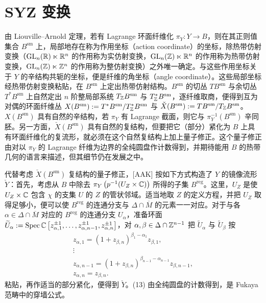\section{SYZ 变换}

由 Liouville--Arnold 定理，若有 Lagrange 环面纤维化 $\pi_Y:Y\to B$，则在其正则值集合 $B^{\mathrm{sm}}$ 上，局部地存在称为作用坐标（action coordinate）的坐标，除热带仿射变换（$\mathrm{GL}_n(\mathbb{R})\ltimes\mathbb{R}^n$ 的作用称为实仿射变换，$\mathrm{GL}_n(\mathbb{Z})\ltimes\mathbb{R}^n$ 的作用称为热带仿射变换，$\mathrm{GL}_n(\mathbb{Z})\ltimes\mathbb{Z}^n$ 的作用称为整仿射变换）之外唯一确定。与这些作用坐标关于 $Y$ 的辛结构共轭的坐标，便是纤维的角坐标（angle coordinate）。这些局部坐标经热带仿射变换粘贴，在 $B^{\mathrm{sm}}$ 上定出热带仿射结构。$B^{\mathrm{sm}}$ 的切丛 $TB^{\mathrm{sm}}$ 与余切丛 $T^*B^{\mathrm{sm}}$ 上自然定出 $n$ 阶整局部系统 $T_{\mathbb{Z}}B^{\mathrm{sm}}$ 与 $T^*_{\mathbb{Z}}B^{\mathrm{sm}}$，逐纤维取商，便得到互为对偶的环面纤维丛 $X(B^{\mathrm{sm}}):=T^*B^{\mathrm{sm}}/T^*_{\mathbb{Z}}B^{\mathrm{sm}}$ 与 $\check X(B^{\mathrm{sm}}):=TB^{\mathrm{sm}}/T_{\mathbb{Z}}B^{\mathrm{sm}}$。$X(B^{\mathrm{sm}})$ 具有自然的辛结构，若 $\pi_Y$ 有 Lagrange 截面，则它与 $\pi_Y^{-1}(B^{\mathrm{sm}})$ 辛同胚。另一方面，$\check X(B^{\mathrm{sm}})$ 具有自然的复结构，但要把它（部分）紧化为 $B$ 上具有环面纤维化的复流形，就必须在这个自然复结构上加上量子修正。这个量子修正由对以 $\pi_Y$ 的 Lagrange 纤维为边界的全纯圆盘作计数得到，并期待能用 $B$ 的热带几何的语言来描述，但其细节仍在发展之中。

代替考虑 $\check X(B^{\mathrm{sm}})$ 复结构的量子修正，[AAK] 按如下方式构造了 $Y$ 的镜像流形 $\check Y$：首先，考虑从 $B$ 中除去 $\pi_Y\left(p^{-1}(U_Z\times\mathbb{C})\right)$ 所得的子集 $B^{\mathrm{reg}}$。这里，$U_Z$ 是使 $U_Z\times\mathbb{C}$ 包含 $\chi$ 的支集 $U$ 的 $Z$ 的管状邻域。适当地取 $Z$ 的定义方程，并把 $U_Z$ 取得足够小，便可以使 $B^{\mathrm{reg}}$ 的连通分支与 $\Delta\cap\overline{M}$ 的元素一一对应。对于与各 $\alpha\in\Delta\cap\overline{M}$ 对应的 $B^{\mathrm{reg}}$ 的连通分支 $U_\alpha$，准备环面 $\widetilde U_\alpha:=\operatorname{Spec}\mathbb{C}\left[z_{\alpha,1}^{\pm1},\dots,z_{\alpha,n-1}^{\pm1},z_{\alpha,n}^{\pm1}\right]$，对 $\alpha,\beta\in\Delta\cap\mathbb{Z}^{n-1}$ 把 $\widetilde U_\alpha$ 与 $\widetilde U_\beta$ 按
\begin{equation}
\begin{gathered}
z_{\alpha,1}=(1+z_{\beta,n})^{\beta_1-\alpha_1}z_{\beta,1},\\
\vdots\\
z_{\alpha,n-1}=(1+z_{\beta,n})^{\beta_{n-1}-\alpha_{n-1}}z_{\beta,n-1},\\
z_{\alpha,n}=z_{\beta,n}.
\end{gathered}
\tag{13}
\end{equation}
\noindent 粘贴，再作适当的部分紧化，便得到 $\check Y$。(13) 由全纯圆盘的计数得到，是 Fukaya 范畴中的穿墙公式。

